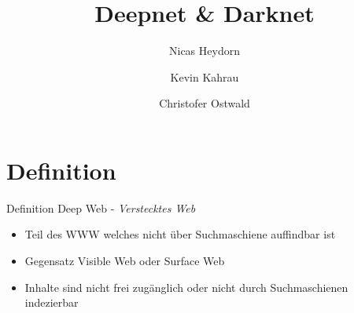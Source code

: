 \documentclass[12pt]{beamer}
\author{Nicas Heydorn \and Kevin Kahrau \and Christofer Ostwald}
\title{Deepnet \& Darknet}
\institute{Nordakademie - Hochschule der Wirtschaft}
\begin{document}
\begin{frame}
\titlepage
\end{frame}

\begin{frame}
\tableofcontents
\end{frame}

\section{Definition}
\begin{frame}{Definition}
	Deep Web - \emph{Verstecktes Web}
	\begin{itemize}
		\item Teil des WWW welches nicht über Suchmaschiene auffindbar ist
		\item Gegensatz Visible Web oder Surface Web
\item Inhalte sind nicht frei zugänglich oder nicht durch Suchmaschienen indezierbar
	\end{itemize}
\end{frame}
\end{document}
